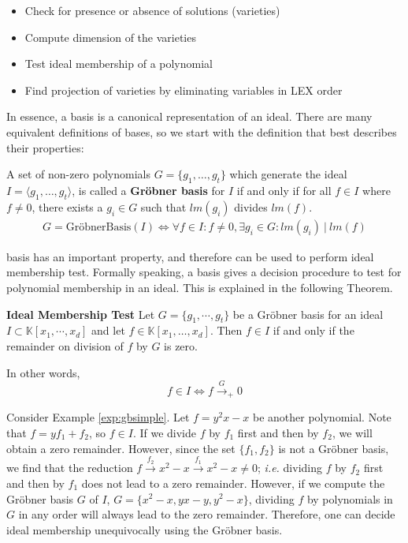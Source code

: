 \begin{itemize}
\item Check for presence or absence of solutions (varieties)
\item Compute dimension of the varieties
\item Test ideal membership of a polynomial
\item Find projection of varieties by eliminating variables in LEX order
\end{itemize} 

In essence, a \Grobner basis is a canonical representation of an ideal.
There are many equivalent definitions of \Grobner bases, so we start with 
the definition that best describes their properties:

\begin{Definition}
A set of non-zero polynomials $G=\{g_1,\dots,g_t\}$ which generate the 
ideal $I=\langle g_1,\dots,g_t\rangle$, is called a 
{\bf Gr\"obner basis} for $I$ if and only if 
for all $f \in I$ where $f \neq 0$, there exists a $g_i \in G$ such that $lm(g_i)$ divides $lm(f)$.
\begin{eqnarray}
G = \text{Gr\"obner{Basis}} (I) \iff 
\forall f \in I: f \neq 0, \exists g_i \in G: lm(g_i)\ |\ lm(f)
        \label{eqn:groebnermin}
    \end{eqnarray}
    
\end{Definition}

\Grobner basis has an important property, and therefore can be used to perform ideal membership test.
Formally speaking, a \Grobner basis gives a decision procedure to test 
for polynomial membership in an ideal. This is explained in the following 
Theorem.
    
\begin{Theorem}\label{the:membership}
	{\bf Ideal Membership Test}
 Let $G = \{g_1,\cdots,g_t \}$ be a Gr\"obner basis for an ideal $I \subset \mathbb{K}[x_1,\cdots,x_d ]$
	and let $f \in \mathbb{K}[x_{1},\dots, x_{d}]$. Then $f \in I$ if and only if the remainder on division of $f$ by
	$G$ is zero.
\end{Theorem}
In other words, 
\begin{equation}
f \in I \iff f \stackrel{G}{\textstyle\longrightarrow}_+0
\end{equation}

\begin{Example}
Consider Example \ref{exp:gbsimple}. Let $f = y^2x - x$ be another
polynomial. Note that $f = yf_1 + f_2$, so $f \in I$. If we divide $f$
by $f_1$ first and then by $f_2$, we will obtain a zero
remainder. However, since the set $\{f_1, f_2\}$ is not a Gr\"{o}bner
basis, we find that the reduction $f
\stackrel{f_2}{\textstyle\longrightarrow} x^2 - x
\stackrel{f_1}{\textstyle\longrightarrow} x^2 - x  \neq 0$;
{\it i.e.} dividing $f$ by $f_2$ first and then by $f_1$ does not lead to a
zero remainder. However,  if we compute the Gr\"{o}bner basis $G$ of
$I$, $G = \{x^2 - x, yx - y, y^2 - x\}$, dividing $f$ by polynomials
in $G$ in any order will always lead to the zero remainder. Therefore,
one can decide ideal membership unequivocally using the Gr\"{o}bner
basis. 
\end{Example}


